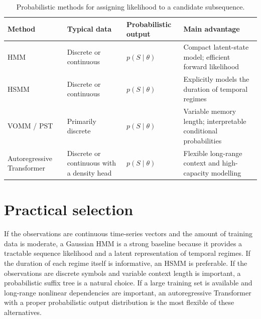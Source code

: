 \documentclass[a4paper]{article}
\begin{document}
        \begin{table}[H]
            \centering
            \begin{tabular}{
                >{\raggedright\arraybackslash}p{}
                >{\raggedright\arraybackslash}p{}
                >{\raggedright\arraybackslash}p{}
                >{\raggedright\arraybackslash}p{}
                }
                \toprule
                Method & Typical data & Probabilistic output & Main advantage \\
                \midrule
                HMM
                & Discrete or continuous
                & \(p(S\mid\theta)\)
                & Compact latent-state model; efficient forward likelihood \\

                HSMM
                & Discrete or continuous
                & \(p(S\mid\theta)\)
                & Explicitly models the duration of temporal regimes \\

                VOMM / PST
                & Primarily discrete
                & \(p(S\mid\theta)\)
                & Variable memory length; interpretable conditional probabilities \\

                Autoregressive Transformer
                & Discrete or continuous with a density head
                & \(p(S\mid\theta)\)
                & Flexible long-range context and high-capacity modelling \\
                \bottomrule
            \end{tabular}
            \caption{Probabilistic methods for assigning likelihood to a candidate subsequence.}
        \end{table}

    \section{Practical selection}

        If the observations are continuous time-series vectors and the amount of training data is moderate, a Gaussian HMM is a strong baseline because it provides a tractable sequence likelihood and a latent representation of temporal regimes. If the duration of each regime itself is informative, an HSMM is preferable. If the observations are discrete symbols and variable context length is important, a probabilistic suffix tree is a natural choice. If a large training set is available and long-range nonlinear dependencies are important, an autoregressive Transformer with a proper probabilistic output distribution is the most flexible of these alternatives.
\end{document}
